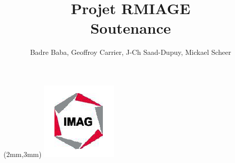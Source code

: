 \documentclass[a4paper,10pt,twoside]{article}
\begin{document}
\title{Projet RMIAGE\\ \Huge{Soutenance}}
\author{
	Badre Baba, Geoffroy Carrier, J-Ch Saad-Dupuy, Mickael Scheer
}

\begin{center}
\begin{textblock*}{35cm}(2mm,3mm)
\includegraphics[scale=0.8]{../cc/imag_logo.png}
\end{textblock*}
\end{center}
 
\maketitle










\end{document}
